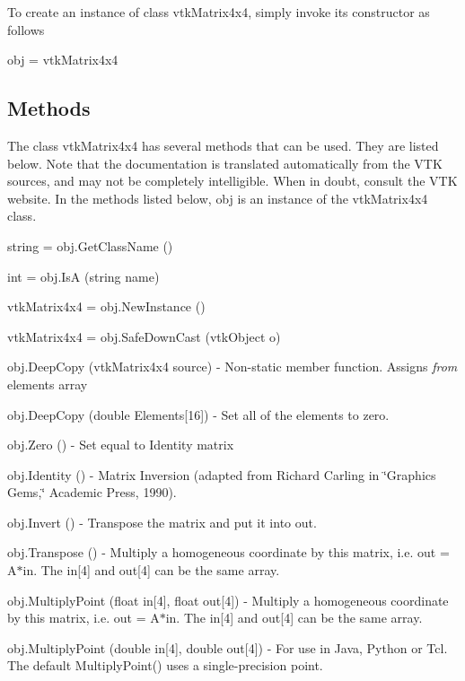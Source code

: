 To create an instance of class vtk\-Matrix4x4, simply invoke its constructor as follows \begin{DoxyVerb}  obj = vtkMatrix4x4
\end{DoxyVerb}
 \hypertarget{vtkwidgets_vtkxyplotwidget_Methods}{}\subsection{Methods}\label{vtkwidgets_vtkxyplotwidget_Methods}
The class vtk\-Matrix4x4 has several methods that can be used. They are listed below. Note that the documentation is translated automatically from the V\-T\-K sources, and may not be completely intelligible. When in doubt, consult the V\-T\-K website. In the methods listed below, {\ttfamily obj} is an instance of the vtk\-Matrix4x4 class. 
\begin{DoxyItemize}
\item {\ttfamily string = obj.\-Get\-Class\-Name ()}  
\item {\ttfamily int = obj.\-Is\-A (string name)}  
\item {\ttfamily vtk\-Matrix4x4 = obj.\-New\-Instance ()}  
\item {\ttfamily vtk\-Matrix4x4 = obj.\-Safe\-Down\-Cast (vtk\-Object o)}  
\item {\ttfamily obj.\-Deep\-Copy (vtk\-Matrix4x4 source)} -\/ Non-\/static member function. Assigns {\itshape from} elements array  
\item {\ttfamily obj.\-Deep\-Copy (double Elements\mbox{[}16\mbox{]})} -\/ Set all of the elements to zero.  
\item {\ttfamily obj.\-Zero ()} -\/ Set equal to Identity matrix  
\item {\ttfamily obj.\-Identity ()} -\/ Matrix Inversion (adapted from Richard Carling in \char`\"{}\-Graphics Gems,\char`\"{} Academic Press, 1990).  
\item {\ttfamily obj.\-Invert ()} -\/ Transpose the matrix and put it into out.  
\item {\ttfamily obj.\-Transpose ()} -\/ Multiply a homogeneous coordinate by this matrix, i.\-e. out = A$\ast$in. The in\mbox{[}4\mbox{]} and out\mbox{[}4\mbox{]} can be the same array.  
\item {\ttfamily obj.\-Multiply\-Point (float in\mbox{[}4\mbox{]}, float out\mbox{[}4\mbox{]})} -\/ Multiply a homogeneous coordinate by this matrix, i.\-e. out = A$\ast$in. The in\mbox{[}4\mbox{]} and out\mbox{[}4\mbox{]} can be the same array.  
\item {\ttfamily obj.\-Multiply\-Point (double in\mbox{[}4\mbox{]}, double out\mbox{[}4\mbox{]})} -\/ For use in Java, Python or Tcl. The default Multiply\-Point() uses a single-\/precision point.  

\end{DoxyItemize}
